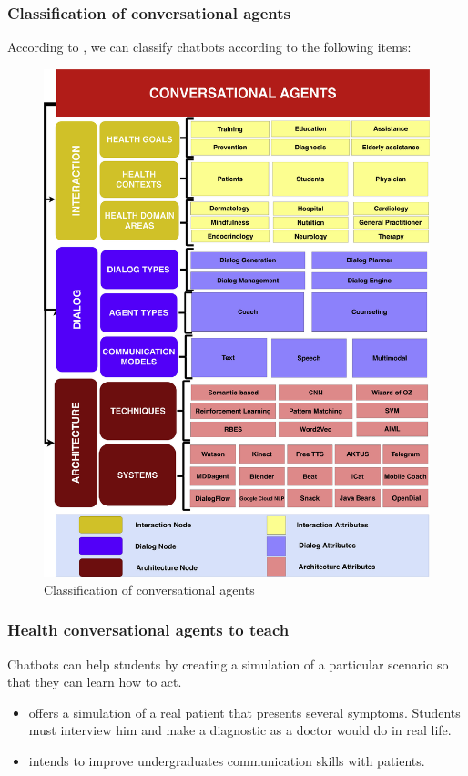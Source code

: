 \documentclass[12pt,english]{article}
\begin{document}
\subsubsection{Classification of conversational agents}

According to \cite{Montenegro201956}, we can classify chatbots according to the following items:

\begin{figure}[H]
  \centering
  \includegraphics{taxonomy.jpg}
  \caption{Classification of conversational agents}
\end{figure}


\subsubsection{Health conversational agents to teach}

Chatbots can help students by creating a simulation of a particular scenario so that they can learn how to act.
\begin{itemize}
  \item \cite{Lopez2008194} offers a simulation of a real patient that presents several symptoms. Students must interview him and make a diagnostic as a doctor would do in real life.
  \item \cite{Shorey2019e14658} intends to improve undergraduates communication skills with patients.
\end{itemize}
\end{document}
